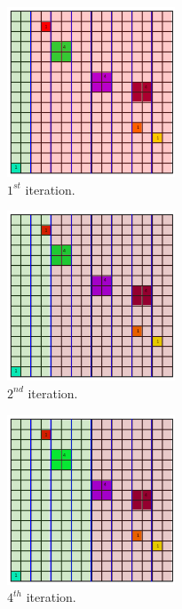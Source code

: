 \documentclass[11pt,a4paper]{article}
\begin{document}
\begin{figure}[H]	
     \centering
     \begin{subfigure}[b]{0.475\textwidth}
         \centering
         \includegraphics[width=5cm]{images/kdtree/grid_2.png}
         \caption{$1^{st} $ iteration.}
         \label{fig:pi_4000}
     \end{subfigure}
     \hfill
     \begin{subfigure}[b]{0.475\textwidth}
         \centering
         \includegraphics[width=5cm]{images/kdtree/grid_3.png}
         \caption{$2^{nd} $ iteration.}
         \label{fig:pi_5000}
     \end{subfigure}
     \hfill
     \begin{subfigure}[b]{0.475\textwidth}
         \centering
         \includegraphics[width=5cm]{images/kdtree/grid_5.png}
         \caption{$4^{th} $ iteration.}
         \label{fig:pi_18000}
     \end{subfigure}
     \hfill
     \begin{subfigure}[b]{0.475\textwidth}

\end{subfigure}
\end{figure}
\end{document}
